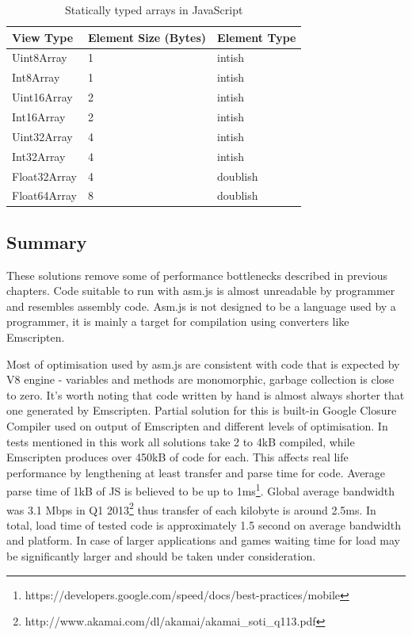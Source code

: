 \begin{table}[h!]
\caption{Statically typed arrays in JavaScript}
\centering
\label{table:jsarrays}
\begin{tabular}{|l|l|l|}
  	\hline
View Type & Element Size (Bytes) & Element Type \\ \hline
Uint8Array & 1 & intish \\ \hline
Int8Array & 1 & intish \\ \hline
Uint16Array & 2 & intish \\ \hline
Int16Array & 2 & intish \\ \hline
Uint32Array & 4 & intish \\ \hline
Int32Array & 4 & intish \\ \hline
Float32Array & 4 & doublish \\ \hline
Float64Array & 8 & doublish \\ \hline
\end{tabular}
\end{table}

\subsection{Summary}
\label{sec:asmjssummary}

These solutions remove some of performance bottlenecks described in previous chapters. Code suitable to run with asm.js is almost unreadable by programmer and resembles assembly code. Asm.js is not designed to be a language used by a programmer, it is mainly a target for compilation using converters like Emscripten. 

Most of optimisation used by asm.js are consistent with code that is expected by V8 engine - variables and methods are monomorphic, garbage collection is close to zero. It's worth noting that code written by hand is almost always shorter that one generated by Emscripten. Partial solution for this is built-in Google Closure Compiler used on output of Emscripten and different levels of optimisation.
In tests mentioned in this work all solutions take 2 to 4kB compiled, while Emscripten produces over 450kB of code for each. This affects real life performance by lengthening at least transfer and parse time for code. Average parse time of 1kB of JS is believed to be up to 1ms\footnote{https://developers.google.com/speed/docs/best-practices/mobile}. Global average bandwidth was 3.1 Mbps in Q1 2013\footnote{http://www.akamai.com/dl/akamai/akamai\_soti\_q113.pdf} thus transfer of each kilobyte is around 2.5ms. In total, load time of tested code is approximately 1.5 second on average bandwidth and platform. In case of larger applications and games waiting time for load may be significantly larger and should be taken under consideration.

